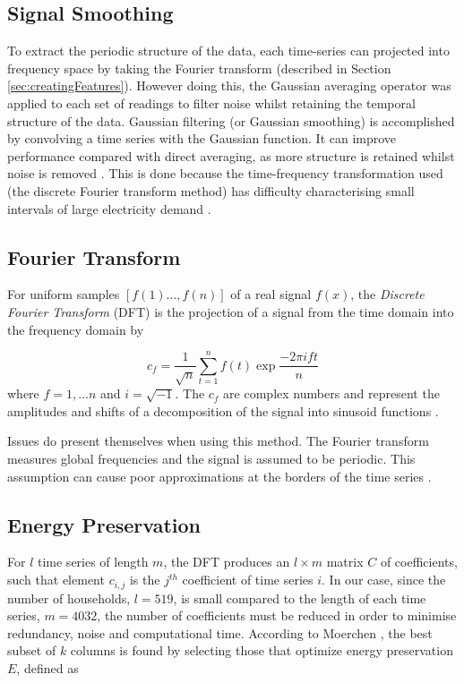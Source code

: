 \subsection*{Signal Smoothing}

To extract the periodic structure of the data, each time-series can projected into frequency space by taking the Fourier transform (described in Section \ref{sec:creatingFeatures}). However doing this, the Gaussian averaging operator was applied to each set of readings to filter noise whilst retaining the temporal structure of the data. Gaussian filtering (or Gaussian smoothing) is accomplished by convolving a time series with the Gaussian function. It can improve performance compared with direct averaging, as more structure is retained whilst noise is removed \cite{Nixon}. This is done because the time-frequency transformation used (the discrete Fourier transform method) has difficulty characterising small intervals of large electricity demand \cite{Graps}.



\householdConv %



\subsection*{Fourier Transform}
\label{sec:Fourier}
For uniform samples $[f(1)...,f(n)]$ of a real signal $f(x)$, the \textit{Discrete Fourier Transform} (DFT) is the projection of a signal from the time domain into the frequency domain by

\[c_f=\frac{1}{\sqrt{n}}\sum_{t=1}^nf(t)\exp{\frac{-2\pi ift}{n}}\]
where $f=1,...n$ and $i=\sqrt{-1}$. The $c_f$ are complex numbers and represent
the amplitudes and shifts of a decomposition of the signal into sinusoid functions \cite{Moerchen}.


Issues do present themselves when using this method. The Fourier transform measures global frequencies and the signal is assumed to be periodic. This assumption can cause poor approximations at the borders of the time series \cite{Moerchen}.

\subsection*{Energy Preservation}

For $l$ time series of length $m$, the DFT produces an $l \times m$ matrix $C $ of coefficients, such that element $c_{i,j}$ is the $j^{th}$ coefficient of time series $i$. In our case, since the number of households, $l=519$, is small compared to the length of each time series, $m=4032$, the number of coefficients must be reduced in order to minimise redundancy, noise and computational time. According to Moerchen \cite{Moerchen}, the best subset of $k$ columns is found by selecting those that optimize energy preservation $E$, defined as

